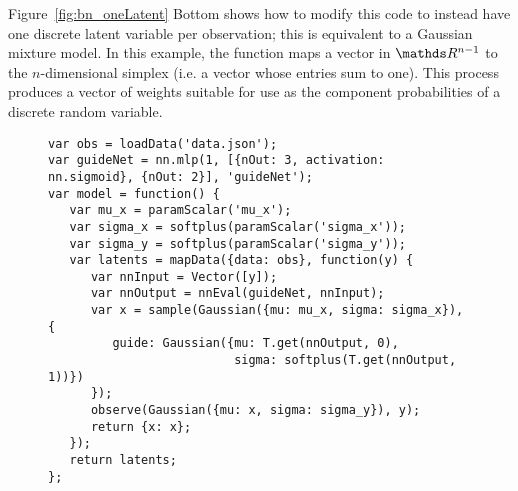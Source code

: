 Figure~\ref{fig:bn_oneLatent} Bottom shows how to modify this code to instead have one discrete latent variable per observation; this is equivalent to a Gaussian mixture model. In this example, the  function maps a vector in $\Reals^{n-1}$ to the $n$-dimensional simplex (i.e. a vector whose entries sum to one). This process produces a vector of weights suitable for use as the component probabilities of a discrete random variable.


\begin{figure}

\begin{minipage}{\linewidth}
\begin{minipage}{0.66\linewidth}
\begin{lstlisting}[style=smaller]
var obs = loadData('data.json');
var guideNet = nn.mlp(1, [{nOut: 3, activation: nn.sigmoid}, {nOut: 2}], 'guideNet');
var model = function() {
   var mu_x = paramScalar('mu_x');
   var sigma_x = softplus(paramScalar('sigma_x'));
   var sigma_y = softplus(paramScalar('sigma_y'));
   var latents = mapData({data: obs}, function(y) {
      var nnInput = Vector([y]);
      var nnOutput = nnEval(guideNet, nnInput);
      var x = sample(Gaussian({mu: mu_x, sigma: sigma_x}), {
         guide: Gaussian({mu: T.get(nnOutput, 0),
                          sigma: softplus(T.get(nnOutput, 1))})
      });
      observe(Gaussian({mu: x, sigma: sigma_y}), y);
      return {x: x};
   });
   return latents;
};
\end{lstlisting}
\end{minipage}
%
\begin{minipage}{0.33\linewidth}
\begin{flushright}
\end{flushright}
\end{minipage}
\end{minipage}


\end{figure}
